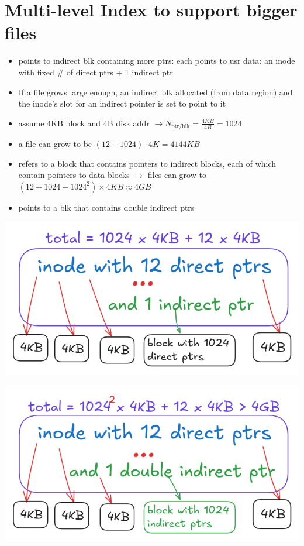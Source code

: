 \section*{Multi-level Index to support bigger files}
\begin{itemize}
\item {} points to indirect blk containing more ptrs: each points to usr data: an inode with fixed \# of direct ptrs + 1 indirect ptr
\item If a file grows large enough, an indirect blk allocated (from data region) and the inode’s slot for an indirect pointer is set to point to it
\item assume 4KB block and 4B disk addr $\to N_{\text{ptr/blk}} = \frac{4KB}{4B} = 1024$
\item a file can grow to be $(12 + 1024) \cdot 4K = 4144KB$
\item {} refers to a block that contains pointers
to indirect blocks, each of which contain pointers to data blocks $\to$ files can grow to $(12 + 1024 + 1024^{2}) \times 4KB \approx 4GB$
\item {} points to a blk that contains double indirect ptrs
\end{itemize}
\begin{minipage}{.5\linewidth}
  \includegraphics[width=\linewidth]{imgs/fs_indirect_ptr1}
\end{minipage}
\begin{minipage}{.5\linewidth}
  \includegraphics[width=\linewidth]{imgs/fs_indirect_ptr2}
\end{minipage}
